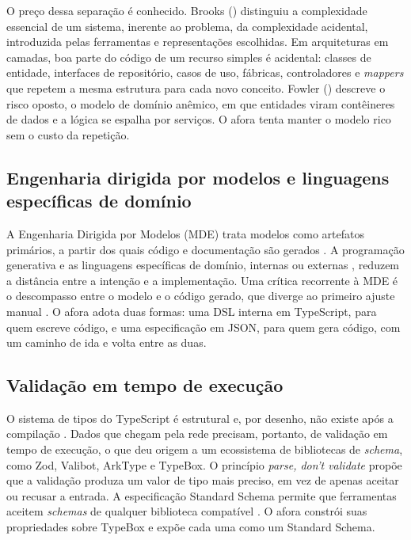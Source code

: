 \documentclass[a4paper,12pt]{article}
\newcommand{\estr}[1]{\textit{#1}}
\begin{document}
O preço dessa separação é conhecido. Brooks (\citeyear{brooks1987}) distinguiu a complexidade essencial de um sistema, inerente ao problema, da complexidade acidental, introduzida pelas ferramentas e representações escolhidas. Em arquiteturas em camadas, boa parte do código de um recurso simples é acidental: classes de entidade, interfaces de repositório, casos de uso, fábricas, controladores e \estr{mappers} que repetem a mesma estrutura para cada novo conceito. Fowler (\citeyear{fowler2003}) descreve o risco oposto, o modelo de domínio anêmico, em que entidades viram contêineres de dados e a lógica se espalha por serviços. O afora tenta manter o modelo rico sem o custo da repetição.

\subsection{Engenharia dirigida por modelos e linguagens específicas de domínio}

A Engenharia Dirigida por Modelos (MDE) trata modelos como artefatos primários, a partir dos quais código e documentação são gerados \citep{schmidt2006,kleppe2003}. A programação generativa \citep{czarnecki2000} e as linguagens específicas de domínio, internas ou externas \citep{fowler2010,voelter2013}, reduzem a distância entre a intenção e a implementação. Uma crítica recorrente à MDE é o descompasso entre o modelo e o código gerado, que diverge ao primeiro ajuste manual \citep{hailpern2006}. O afora adota duas formas: uma DSL interna em TypeScript, para quem escreve código, e uma especificação em JSON, para quem gera código, com um caminho de ida e volta entre as duas.

\subsection{Validação em tempo de execução}

O sistema de tipos do TypeScript é estrutural e, por desenho, não existe após a compilação \citep{bierman2014}. Dados que chegam pela rede precisam, portanto, de validação em tempo de execução, o que deu origem a um ecossistema de bibliotecas de \estr{schema}, como Zod, Valibot, ArkType e TypeBox. O princípio \estr{parse, don't validate} \citep{king2019} propõe que a validação produza um valor de tipo mais preciso, em vez de apenas aceitar ou recusar a entrada. A especificação Standard Schema permite que ferramentas aceitem \estr{schemas} de qualquer biblioteca compatível \citep{standardschema2025}. O afora constrói suas propriedades sobre TypeBox e expõe cada uma como um Standard Schema.
\end{document}
